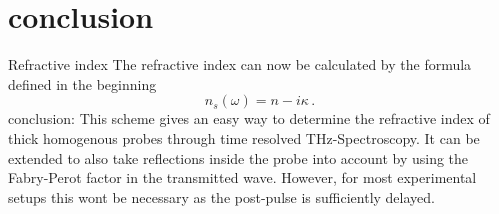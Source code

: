 \documentclass[aspectratio=1610, 9pt]{beamer}
\begin{document}
\section{conclusion}
\begin{frame}{Refractive index}
  The refractive index can now be calculated by the formula defined in the beginning
  \begin{equation}
    n_s(\omega) = n - i \kappa \, .
  \end{equation}
  \newline
  \textcolor{tugreen}{conclusion:} This scheme gives an easy way to determine the refractive index of thick homogenous probes through time resolved THz-Spectroscopy.
  It can be extended to also take reflections inside the probe into account by using the Fabry-Perot factor in the transmitted wave.
  However, for most experimental setups this wont be necessary as the post-pulse is sufficiently delayed.

\end{frame}
\end{document}
